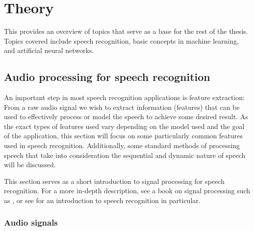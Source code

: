 %
%
%

\chapter{Theory}
\label{ch:theory}

This  provides an overview of topics that serve as a base for the rest of the thesis.
Topics covered include speech recognition, basic concepts in machine learning, and artificial neural networks.

\section{Audio processing for speech recognition}

An important step in most speech recognition applications is feature extraction: From a raw audio signal we wish to extract information (features) that can be used to effectively process or model the speech to achieve some desired result.
As the exact types of features used vary depending on the model used and the goal of the application, this section will focus on some particularly common features used in speech recognition.
Additionally, some standard methods of processing speech that take into consideration the sequential and dynamic nature of speech will be discussed.

This section serves as a short introduction to signal processing for speech recognition.
For a more in-depth description, see a book on signal processing such as \textcite{quatieri2002discrete}, or see \textcite{huang2001spoken} for an introduction to speech recognition in particular.

\subsection{Audio signals}

